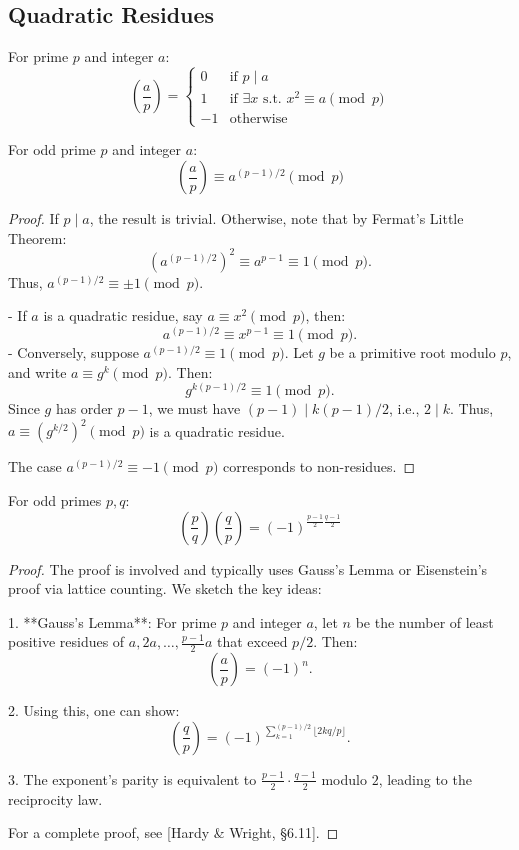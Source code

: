 \documentclass{scrartcl} %
\begin{document}
\subsection{Quadratic Residues}

\begin{definition}\label{def:legendresymbol}
For prime $p$ and integer $a$:
\[ \left(\frac{a}{p}\right) = \begin{cases}
0 & \text{if } p \mid a \\
1 & \text{if } \exists x \text{ s.t. } x^2 \equiv a \pmod{p} \\
-1 & \text{otherwise}
\end{cases}\]
\end{definition}

\begin{theorem}\label{thm:eulerscriterion}
For odd prime $p$ and integer $a$:
\[ \left(\frac{a}{p}\right) \equiv a^{(p-1)/2} \pmod{p} \]
\end{theorem}

\begin{proof}
If $p \mid a$, the result is trivial. Otherwise, note that by Fermat's Little Theorem:
\[
(a^{(p-1)/2})^2 \equiv a^{p-1} \equiv 1 \pmod{p}.
\]
Thus, $a^{(p-1)/2} \equiv \pm 1 \pmod{p}$.

- If $a$ is a quadratic residue, say $a \equiv x^2 \pmod{p}$, then:
\[
a^{(p-1)/2} \equiv x^{p-1} \equiv 1 \pmod{p}.
\]
- Conversely, suppose $a^{(p-1)/2} \equiv 1 \pmod{p}$. Let $g$ be a primitive root modulo $p$, and write $a \equiv g^k \pmod{p}$. Then:
\[
g^{k(p-1)/2} \equiv 1 \pmod{p}.
\]
Since $g$ has order $p-1$, we must have $(p-1) \mid k(p-1)/2$, i.e., $2 \mid k$. Thus, $a \equiv (g^{k/2})^2 \pmod{p}$ is a quadratic residue.

The case $a^{(p-1)/2} \equiv -1 \pmod{p}$ corresponds to non-residues.
\end{proof}

\begin{theorem}\label{thm:quadraticreciprocity}
For odd primes $p,q$:
\[ \left(\frac{p}{q}\right)\left(\frac{q}{p}\right) = (-1)^{\frac{p-1}{2}\frac{q-1}{2}} \]
\end{theorem}

\begin{proof}
The proof is involved and typically uses Gauss's Lemma or Eisenstein's proof via lattice counting. We sketch the key ideas:

1. **Gauss's Lemma**: For prime $p$ and integer $a$, let $n$ be the number of least positive residues of $a, 2a, \ldots, \frac{p-1}{2}a$ that exceed $p/2$. Then:
\[
\left(\frac{a}{p}\right) = (-1)^n.
\]

2. Using this, one can show:
\[
\left(\frac{q}{p}\right) = (-1)^{\sum_{k=1}^{(p-1)/2} \lfloor 2kq/p \rfloor}.
\]

3. The exponent's parity is equivalent to $\frac{p-1}{2} \cdot \frac{q-1}{2}$ modulo $2$, leading to the reciprocity law.

For a complete proof, see [Hardy \& Wright, §6.11].
\end{proof}
\end{document}
